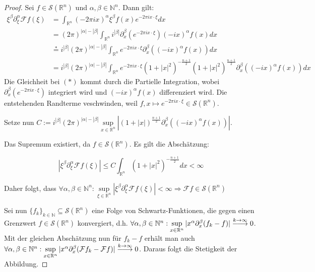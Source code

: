 \documentclass{article}
\newcommand{\R}[0]{\mathbb{R}}
\newcommand{\N}[0]{\mathbb{N}}
\newcommand{\F}[0]{\mathcal{F}}
\newcommand{\Ssp}[0]{\mathcal{S}}
\DeclareRobustCommand{\loongrightarrow}{%
  \DOTSB\relbar\joinrel\relbar\joinrel\rightarrow
}
\begin{document}
\begin{proof}\cite[S. 424, Theorem 24.1.1]{ebert2018methods}
    Sei $f \in \Ssp(\R^n)$ und $\alpha, \beta \in \N^n$. Dann gilt:
    \begin{align*}
        \xi^{\beta}\partial_{\xi}^{\alpha}\F f(\xi) &= \int_{\R^n} (-2\pi i x)^{\alpha} \xi^{\beta} f(x) e^{-2\pi i x \cdot \xi} dx \\
        &= (2\pi)^{|\alpha| - |\beta|} \int_{\R^n} i^{|\beta|} \partial_{x}^{\beta}(e^{-2\pi i x \cdot \xi}) (-ix)^{\alpha} f(x) dx \\
        &\overset{\text{*}}{=}i^{|\beta|}(2\pi)^{|\alpha| - |\beta|} \int_{\R^n} e^{-2\pi i x \cdot \xi} \partial_{x}^{\beta}((-ix)^{\alpha}f(x)) dx \\
        &= i^{|\beta|}(2\pi)^{|\alpha| - |\beta|} \int_{\R^n} e^{-2\pi i x \cdot \xi} (1+|x|^2)^{-\frac{n+1}{2}} (1+|x|^2)^{\frac{n+1}{2}} \partial_{x}^{\beta}((-ix)^{\alpha}f(x)) dx
    \end{align*}
    Die Gleichheit bei $(*)$ kommt durch die Partielle Integration, wobei $\partial_{x}^{\beta}(e^{-2\pi i x \cdot \xi})$ integriert wird und $(-ix)^{\alpha} f(x)$ differenziert wird. Die entstehenden Randterme veschwinden, weil $f, x \mapsto e^{-2\pi i x\cdot \xi} \in \Ssp(\R^n)$.
    
    Setze nun $C := i^{|\beta|}(2\pi)^{|\alpha| - |\beta|} \sup\limits_{x \in \R^n} |(1+|x|)^{\frac{n+1}{2}} \partial_{x}^{\beta}((-ix)^{\alpha}f(x))|$. 
    
    Das Supremum existiert, da $f \in \Ssp(\R^n)$. Es gilt die Abschätzung:
    
    \begin{equation*}
        |\xi^{\beta}\partial_{\xi}^{\alpha}\F f(\xi)| \leq C \int_{\R^n} (1+|x|^2)^{-\frac{n+1}{2}} dx < \infty
    \end{equation*}

    Daher folgt, dass $\forall \alpha, \beta\in \N^n: \sup\limits_{\xi \in \R^n} \left|\xi^{\beta}\partial_{\xi}^{\alpha}\F f(\xi)\right| < \infty \Rightarrow \F f \in \Ssp(\R^n)$

    Sei nun $\{f_k\}_{k\in\N} \subseteq \Ssp(\R^n)$ eine Folge von Schwartz-Funktionen, die gegen einen Grenzwert $f \in \Ssp(\R^n)$ konvergiert, 
    d.h. $\forall \alpha,\beta\in\N^n: \sup\limits_{x \in \R^n} |x^{\alpha}\partial_x^{\beta}(f_k - f)| \overset{k \to \infty}{\loongrightarrow} 0$.
    Mit der gleichen Abschätzung nun für $f_k - f$ erhält man auch $\forall \alpha,\beta\in\N^n: \sup\limits_{x \in \R^n} |x^{\alpha}\partial_x^{\beta}(\F f_k - \F f)| \overset{k \to \infty}{\loongrightarrow} 0$.
    Daraus folgt die Stetigkeit der Abbildung.
\end{proof}
\end{document}
